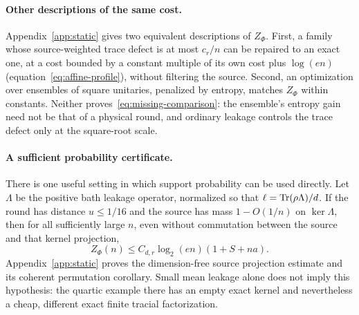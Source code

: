 \paragraph{Other descriptions of the same cost.}
Appendix~\ref{app:static} gives two equivalent descriptions of $Z_\Phi$. First, a family whose
source-weighted trace defect is at most $c_r/n$ can be repaired to an exact one, at a cost bounded by a constant multiple of its
own cost plus $\log(en)$ (equation~\eqref{eq:affine-profile}), without filtering the source. Second, an optimization over ensembles of square unitaries,
penalized by entropy, matches $Z_\Phi$ within constants. Neither proves~\eqref{eq:missing-comparison}:
the ensemble's entropy gain need not be that of a physical round, and ordinary leakage controls the trace
defect only at the square-root scale.

\paragraph{A sufficient probability certificate.}
There is one useful setting in which support probability can be used
directly. Let $\Lambda$ be the positive bath leakage operator, normalized
so that $\ell=\operatorname{Tr}(\rho\Lambda)/d$. If the round has distance $u\le1/16$
and the source has mass $1-O(1/n)$ on $\ker\Lambda$, then for all
sufficiently large $n$, even without commutation between the source and
that kernel projection,
\[
 Z_\Phi(n)\leq C_{d,r}\log_2(en)(1+S+na).
\]
Appendix~\ref{app:static} proves the dimension-free source projection
estimate and its coherent permutation corollary. Small mean leakage
alone does not imply this hypothesis: the quartic example there has
an empty exact kernel and nevertheless a cheap, different exact finite tracial factorization.
